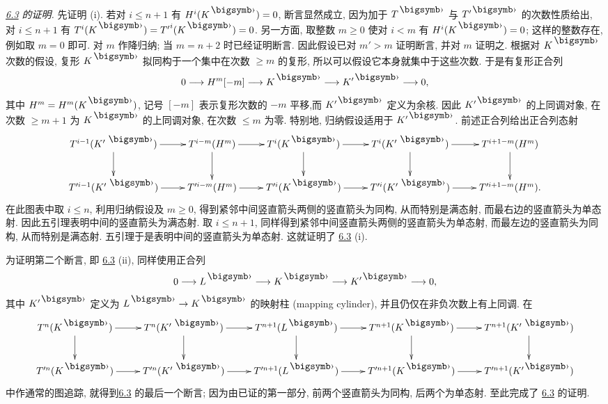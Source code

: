 \medskip
\noindent
\emph{\hyperref[XII.cor6.3]{6.3} 的证明.} 先证明 (i). 若对 $i\leq n+1$ 有 $H^{i}(K^{\bigdot})=0$, 断言显然成立, 因为加于 $T^{\bigdot}$ 与 $T'^{\bigdot}$ 的次数性质给出, 对 $i\leq n+1$ 有 $T^{i}(K^{\bigdot})={T'}^{i}(K^{\bigdot})=0$. 另一方面, 取整数 $m\geq0$ 使对 $i<m$ 有 $H^{i}(K^{\bigdot})=0$; 这样的整数存在, 例如取 $m=0$ 即可. 对 $m$ 作降归纳; 当 $m=n+2$ 时已经证明断言. 因此假设已对 $m'>m$ 证明断言, 并对 $m$ 证明之. 根据对 $K^{\bigdot}$ 次数的假设, 复形 $K^{\bigdot}$ 拟同构于一个集中在次数 $\geq m$ 的复形, 所以可以假设它本身就集中于这些次数. 于是有复形正合列
$$
0\longrightarrow H^m[-m]\longrightarrow K^{\bigdot}\longrightarrow
K'^{\bigdot}\longrightarrow 0{\quoi},
$$
其中 $H^m=H^m(K^{\bigdot})$, 记号 $[-m]$ 表示复形次数的 $-m$ 平移,\pageoriginale 而 $K'^{\bigdot}$ 定义为余核. 因此 $K'^{\bigdot}$ 的上同调对象, 在次数 $\geq m+1$ 为 $K^{\bigdot}$ 的上同调对象, 在次数 $\leq m$ 为零. 特别地, 归纳假设适用于 $K'^{\bigdot}$. 前述正合列给出正合列态射
$$
\xymatrix{
T^{i-1} (K'^{\;\bigdot}) \ar[d] \ar[r] & T^{i-m}(H^m)  \ar[r]\ar[d] &
T^{i}(K^{\bigdot}) \ar[r] \ar[d]& T^{i} (K'^{\;\bigdot})  \ar[r] \ar[d]&
T^{i+1-m}(H^m) \ar[d]\\
T'^{i-1}(K'^{\;\bigdot})  \ar[r] & T'^{i-m}(H^m)  \ar[r] &
T'^{i}(K^{\bigdot})  \ar[r] & T'^{i}(K'^{\;\bigdot})  \ar[r] & T'^{i+1-m}(H^m).
}
$$
在此图表中取 $i\leq n$, 利用归纳假设及 $m\geq0$, 得到紧邻中间竖直箭头两侧的竖直箭头为同构, 从而特别是满态射, 而最右边的竖直箭头为单态射. 因此五引理表明中间的竖直箭头为满态射. 取 $i\leq n+1$, 同样得到紧邻中间竖直箭头两侧的竖直箭头为单态射, 而最左边的竖直箭头为同构, 从而特别是满态射. 五引理于是表明中间的竖直箭头为单态射. 这就证明了 \hyperref[XII.cor6.3]{6.3} (i).

为证明第二个断言, 即 \hyperref[XII.cor6.3]{6.3} (ii), 同样使用正合列
$$
0\longrightarrow L^{\bigdot}\longrightarrow K^{\bigdot}\longrightarrow
K'^{\bigdot}\longrightarrow 0{\quoi},
$$
其中 $K'^{\bigdot}$ 定义为 $L^{\bigdot}\to K^{\bigdot}$ 的映射柱 (mapping cylinder), 并且仍仅在非负次数上有上同调. 在
$$
\xymatrix{
T^{n}(K^{\bigdot})  \ar[r] \ar[d]& T^{n}(K'^{\;\bigdot})  \ar[r] \ar[d]& T^{n+1}
(L^{\bigdot})  \ar[r]\ar[d] & {T^{n+1}(K^{\bigdot})}  \ar[r]
\ar[d]&{T^{n+1}(K'^{\;\bigdot})} \ar[d]\\
T'^{n}(K^{\bigdot}) \ar[r] & T'^{n}(K'^{\;\bigdot})  \ar[r] &
T'^{n+1}(L^{\bigdot}) \ar[r] & T'^{n+1}(K^{\bigdot}) \ar[r] & T'^{n+1}(K'^{\bigdot})
}
$$
中作通常的图追踪, 就得到\pageoriginale \hyperref[XII.cor6.3]{6.3} 的最后一个断言; 因为由已证的第一部分, 前两个竖直箭头为同构, 后两个为单态射. 至此完成了 \hyperref[XII.cor6.3]{6.3} 的证明.

